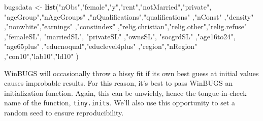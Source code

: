 \documentclass[12pt,twoside]{article}
\newenvironment{Shaded}{}{}
\newcommand{\KeywordTok}[1]{\textcolor[rgb]{0.00,0.44,0.13}{\textbf{{#1}}}}
\newcommand{\StringTok}[1]{\textcolor[rgb]{0.25,0.44,0.63}{{#1}}}
\newcommand{\NormalTok}[1]{{#1}}
\begin{document}
\begin{Shaded}
\begin{Highlighting}[]
\NormalTok{bugsdata <-}\StringTok{ }\KeywordTok{list}\NormalTok{(}\StringTok{"nObs"}\NormalTok{,}\StringTok{"female"}\NormalTok{,}\StringTok{"y"}\NormalTok{,}\StringTok{"rent"}\NormalTok{,}\StringTok{"notMarried"}\NormalTok{,}\StringTok{"private"}\NormalTok{,}
            \StringTok{"ageGroup"}\NormalTok{,}\StringTok{"nAgeGroups"}
            \NormalTok{,}\StringTok{"nQualifications"}\NormalTok{,}\StringTok{"qualifications"}
            \NormalTok{,}\StringTok{"nConst"}
            \NormalTok{,}\StringTok{"density"}
            \NormalTok{,}\StringTok{"nonwhite"}\NormalTok{,}\StringTok{"earnings"}
            \NormalTok{,}\StringTok{"constindex"}
            \NormalTok{,}\StringTok{"relig.christian"}\NormalTok{,}\StringTok{"relig.other"}\NormalTok{,}\StringTok{"relig.refuse"}
            \NormalTok{,}\StringTok{"femaleSL"}\NormalTok{, }\StringTok{"marriedSL"}\NormalTok{, }\StringTok{"privateSL"}
            \NormalTok{,}\StringTok{"ownsSL"}\NormalTok{, }\StringTok{"socgrdSL"}
            \NormalTok{,}\StringTok{"age16to24"}\NormalTok{, }\StringTok{"age65plus"}
            \NormalTok{,}\StringTok{"educnoqual"}\NormalTok{,}\StringTok{"educlevel4plus"}
            \NormalTok{,}\StringTok{"region"}\NormalTok{,}\StringTok{"nRegion"}
            \NormalTok{,}\StringTok{"con10"}\NormalTok{,}\StringTok{"lab10"}\NormalTok{,}\StringTok{"ld10"}
        \NormalTok{)}
\end{Highlighting}
\end{Shaded}

WinBUGS will occasionally throw a hissy fit if its own best guess at
initial values causes improbable results. For this reason, it's best to
pass WinBUGS an initialization function. Again, this can be unwieldy,
hence the tongue-in-cheek name of the function, \texttt{tiny.inits}.
We'll also use this opportunity to set a random seed to ensure
reproducibility.
\end{document}
